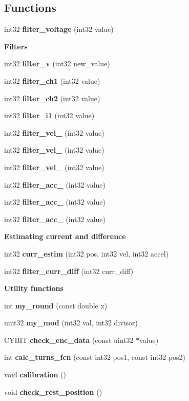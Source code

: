 \subsection*{Functions}
\begin{DoxyCompactItemize}
\item 
int32 \textbf{ filter\+\_\+voltage} (int32 value)
\end{DoxyCompactItemize}
\begin{Indent}\textbf{ Filters}\par
\begin{DoxyCompactItemize}
\item 
int32 \textbf{ filter\+\_\+v} (int32 new\+\_\+value)
\item 
int32 \textbf{ filter\+\_\+ch1} (int32 value)
\item 
int32 \textbf{ filter\+\_\+ch2} (int32 value)
\item 
int32 \textbf{ filter\+\_\+i1} (int32 value)
\item 
int32 \textbf{ filter\+\_\+vel\+\_} (int32 value)
\item 
int32 \textbf{ filter\+\_\+vel\+\_} (int32 value)
\item 
int32 \textbf{ filter\+\_\+vel\+\_} (int32 value)
\item 
int32 \textbf{ filter\+\_\+acc\+\_} (int32 value)
\item 
int32 \textbf{ filter\+\_\+acc\+\_} (int32 value)
\item 
int32 \textbf{ filter\+\_\+acc\+\_} (int32 value)
\end{DoxyCompactItemize}
\end{Indent}
\begin{Indent}\textbf{ Estimating current and difference}\par
\begin{DoxyCompactItemize}
\item 
int32 \textbf{ curr\+\_\+estim} (int32 pos, int32 vel, int32 accel)
\item 
int32 \textbf{ filter\+\_\+curr\+\_\+diff} (int32 curr\+\_\+diff)
\end{DoxyCompactItemize}
\end{Indent}
\begin{Indent}\textbf{ Utility functions}\par
\begin{DoxyCompactItemize}
\item 
int \textbf{ my\+\_\+round} (const double x)
\item 
uint32 \textbf{ my\+\_\+mod} (int32 val, int32 divisor)
\item 
C\+Y\+B\+IT \textbf{ check\+\_\+enc\+\_\+data} (const uint32 $\ast$value)
\item 
int \textbf{ calc\+\_\+turns\+\_\+fcn} (const int32 pos1, const int32 pos2)
\item 
void \textbf{ calibration} ()
\item 
\mbox{\label{utils_8h_a2cb024aea0170c085d18670f5a851df8}} 
void {\bfseries check\+\_\+rest\+\_\+position} ()
\end{DoxyCompactItemize}
\end{Indent}


